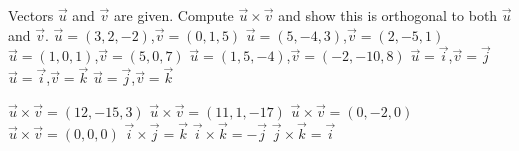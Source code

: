 
\begin{Exercise}[
name={},
title={}, 
difficulty=0,
origin={\cite{GHC}}]
Vectors $\vec u$ and $\vec v$ are given. Compute $\vec u\times\vec v$ and show this is orthogonal to both $\vec u$ and $\vec v$.
\Question $\vec u = (3,2,-2)$,\quad $\vec v = (0,1,5)$
\Question $\vec u = (5,-4,3)$,\quad $\vec v = (2,-5,1)$
\Question $\vec u = (1,0,1)$,\quad $\vec v = (5,0,7)$
\Question $\vec u = (1,5,-4)$,\quad $\vec v = (-2,-10,8)$
\Question $\vec u = \vec i$,\quad $\vec v = \vec j$
\Question $\vec u = \vec i$,\quad $\vec v = \vec k$
\Question $\vec u = \vec j$,\quad $\vec v = \vec k$
\end{Exercise}

\begin{Answer}
\Question $\vec u\times\vec v = (12,-15,3)$
\Question $\vec u\times\vec v = (11,1,-17)$
\Question $\vec u\times\vec v = (0,-2,0)$
\Question $\vec u\times\vec v = (0,0,0)$
\Question $\vec i\times\vec j = \vec k$
\Question $\vec i\times\vec k = -\vec j$
\Question $\vec j\times\vec k = \vec i$
\end{Answer}
